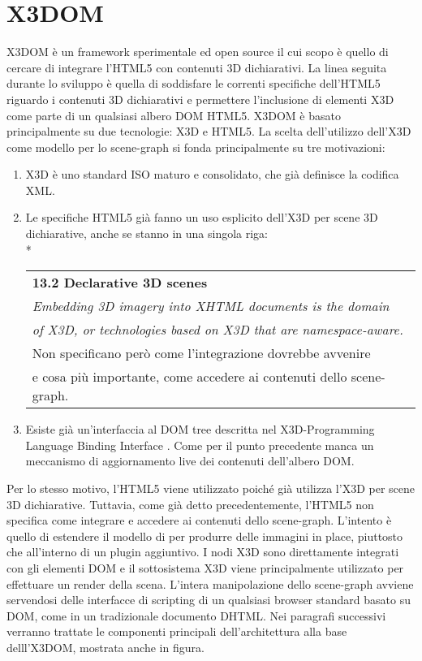 \section{X3DOM}
X3DOM è un framework sperimentale ed open source il cui scopo è quello di cercare di integrare l'HTML5 con contenuti 3D dichiarativi. 
La linea seguita durante lo sviluppo è quella di soddisfare le correnti specifiche dell'HTML5 riguardo i contenuti 3D dichiarativi\cite{W3C-d} e 
permettere l'inclusione di elementi X3D come parte di un qualsiasi albero DOM HTML5. X3DOM è basato principalmente su due tecnologie: X3D e HTML5.
La scelta dell'utilizzo dell'X3D come modello per lo scene-graph si fonda principalmente su tre motivazioni:
\begin{enumerate}
	\item X3D è uno standard ISO maturo e consolidato, che già definisce la codifica XML.
	\item Le specifiche HTML5 già fanno un uso esplicito dell'X3D per scene 3D dichiarative, anche se stanno in una singola riga:
		\\*
		\begin{tabular}{l}
		\bfseries 13.2 Declarative 3D scenes\\*
		\textit{Embedding 3D imagery into XHTML documents is the domain} \\*
		\textit{of X3D, or technologies based on X3D that are namespace-aware.}\\*
		Non specificano però come l'integrazione dovrebbe avvenire\\*
		e cosa più importante, come accedere ai contenuti dello scene-graph.\\*
		\end{tabular}
	\item Esiste già un'interfaccia al DOM tree descritta nel X3D-Programming Language Binding Interface \cite{Web3DConsortium-c}. Come per il punto precedente 
			manca un meccanismo di aggiornamento live dei contenuti dell'albero DOM.
\end{enumerate}
Per lo stesso motivo, l'HTML5 viene utilizzato poiché già utilizza l'X3D per scene 3D dichiarative. Tuttavia, come già detto precedentemente, 
l'HTML5 non specifica come integrare e accedere ai contenuti dello scene-graph. L'intento è quello di estendere il modello di per produrre delle 
immagini in place, piuttosto che all'interno di un plugin aggiuntivo. I nodi X3D sono direttamente integrati con gli elementi DOM e il sottosistema
X3D viene principalmente utilizzato per effettuare un render della scena. L'intera manipolazione dello scene-graph avviene servendosi delle interfacce 
di scripting di un qualsiasi browser standard basato su DOM, come in un tradizionale documento DHTML.
Nei paragrafi successivi verranno trattate le componenti principali dell'architettura alla base delll'X3DOM, mostrata anche in figura.

